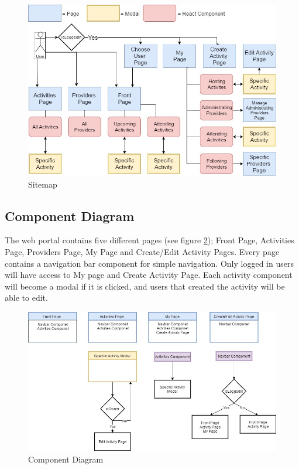 \begin{figure}[H]
\centering
    \includegraphics[width=\textwidth]{fig/siteMap}
\caption{Sitemap}
\label{Sitemap_Diagram}
\end{figure}

\subsection{Component Diagram}
The web portal contains five different pages (see figure \ref{Component_Diagram}); Front Page, Activities Page, Providers Page, My Page and Create/Edit Activity Pages. Every page contains a navigation bar component for simple navigation. Only logged in users will have access to My page and Create Activity Page. Each activity component will become a modal if it is clicked, and users that created the activity will be able to edit.

\begin{figure}[H]
\centering
    \includegraphics[width=\textwidth]{fig/Component_diagram}
\caption{Component Diagram}
\label{Component_Diagram}
\end{figure}

